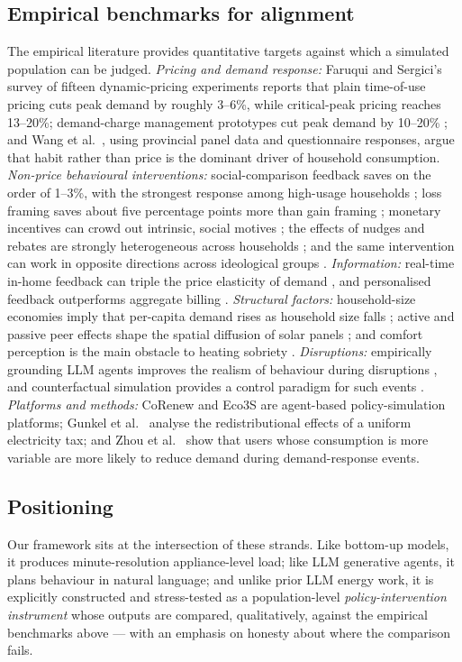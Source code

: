 \documentclass[11pt]{article}
\begin{document}
\subsection{Empirical benchmarks for alignment}
The empirical literature provides quantitative targets against which a simulated population can be
judged. \emph{Pricing and demand response:} Faruqui and Sergici's survey of fifteen dynamic-pricing
experiments \cite{faruqui2010} reports that plain time-of-use pricing cuts peak demand by roughly
3--6\%, while critical-peak pricing reaches 13--20\%; demand-charge management prototypes cut peak demand
by 10--20\% \cite{escarrega2025}; and Wang et al.\ \cite{wang2021}, using provincial panel data and
questionnaire responses, argue that habit rather than price is the dominant driver of household
consumption. \emph{Non-price behavioural interventions:} social-comparison feedback saves on the order of
1--3\%, with the strongest response among high-usage households \cite{allcott2011,ayres2013}; loss framing
saves about five percentage points more than gain framing \cite{ghesla2019}; monetary incentives can crowd
out intrinsic, social motives \cite{pellerano2017}; the effects of nudges and rebates are strongly
heterogeneous across households \cite{murakami2022}; and the same intervention can work in opposite
directions across ideological groups \cite{costa2010}. \emph{Information:} real-time in-home feedback can
triple the price elasticity of demand \cite{jessoe2012}, and personalised feedback outperforms aggregate
billing \cite{monacchi2015}. \emph{Structural factors:} household-size economies imply that per-capita
demand rises as household size falls \cite{schroder2013}; active and passive peer effects shape the
spatial diffusion of solar panels \cite{barnes2022}; and comfort perception is the main obstacle to
heating sobriety \cite{cabezas2025}. \emph{Disruptions:} empirically grounding LLM agents improves the
realism of behaviour during disruptions \cite{xia2026}, and counterfactual simulation provides a control
paradigm for such events \cite{fidone2025}. \emph{Platforms and methods:} CoRenew \cite{zhang2026} and
Eco3S \cite{wei2026} are agent-based policy-simulation platforms; Gunkel et al.\ \cite{gunkel2023}
analyse the redistributional effects of a uniform electricity tax; and Zhou et al.\ \cite{zhou2016} show
that users whose consumption is more variable are more likely to reduce demand during demand-response
events.

\subsection{Positioning}
Our framework sits at the intersection of these strands. Like bottom-up models, it produces
minute-resolution appliance-level load; like LLM generative agents, it plans behaviour in natural
language; and unlike prior LLM energy work, it is explicitly constructed and stress-tested as a
population-level \emph{policy-intervention instrument} whose outputs are compared, qualitatively, against
the empirical benchmarks above --- with an emphasis on honesty about where the comparison fails.
\end{document}
